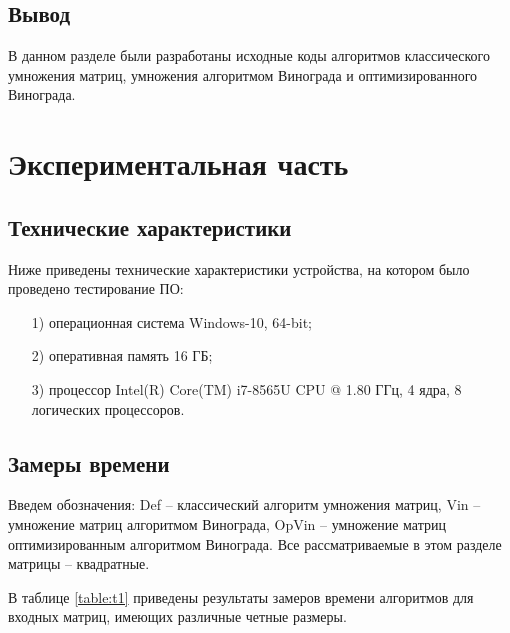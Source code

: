 \documentclass[12pt]{report}
\begin{document}
	\section*{Вывод}
	
	В данном разделе были разработаны исходные коды алгоритмов классического умножения матриц, умножения алгоритмом Винограда и оптимизированного Винограда.
	
	\chapter{Экспериментальная часть}
	
	\section{Технические характеристики}
	
	Ниже приведены технические характеристики устройства, на котором было проведено тестирование ПО:
	
	\begin{enumerate}
		\item[1)] операционная система Windows-10, 64-bit;
		\item[2)] оперативная память 16 ГБ;
		\item[3)] процессор Intel(R) Core(TM) i7-8565U CPU @ 1.80 ГГц, 4 ядра, 8 логических процессоров.
	\end{enumerate}
	
	\section{Замеры времени}
	
	Введем обозначения: Def -- классический алгоритм умножения матриц, Vin -- умножение матриц алгоритмом Винограда, OpVin -- умножение матриц оптимизированным алгоритмом Винограда.
	Все рассматриваемые в этом разделе матрицы -- квадратные.
	
	В таблице \ref{table:t1} приведены результаты замеров времени алгоритмов для входных матриц, имеющих различные четные размеры.
	
\end{document}
